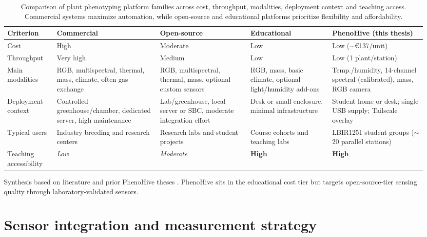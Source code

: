 \begin{table}[H]
\centering
\caption[Phenotyping Platform Families Comparison]{Comparison of plant phenotyping platform families across cost, throughput, modalities, deployment context and teaching access. Commercial systems maximize automation, while open-source and educational platforms prioritize flexibility and affordability.}
\label{tab:platform-landscape-comparison}

\footnotesize
\setlength{\tabcolsep}{4pt}
\renewcommand{\arraystretch}{1.25}
\begin{tabularx}{\textwidth}{P{2.6cm}Y Y Y Y}
\textbf{Criterion} & \textbf{Commercial} & \textbf{Open-source} & \textbf{Educational} & \textbf{PhenoHive (this thesis)} \\
\hline
Cost & High & Moderate & Low & Low ($\sim$€137/unit) \\
Throughput & Very high & Medium & Low & Low (1 plant/station) \\
Main modalities & RGB, multispectral, thermal, mass, climate, often gas exchange & RGB, multispectral, thermal, mass, optional custom sensors & RGB, mass, basic climate, optional light/humidity add-ons & Temp./humidity, 14-channel spectral (calibrated), mass, RGB camera \\
Deployment context & Controlled greenhouse/chamber, dedicated server, high maintenance & Lab/greenhouse, local server or SBC, moderate integration effort & Desk or small enclosure, minimal infrastructure & Student home or desk; single USB supply; Tailscale overlay \\
Typical users & Industry breeding and research centers & Research labs and student projects & Course cohorts and teaching labs & LBIR1251 student groups ($\sim$20 parallel stations) \\
Teaching accessibility & \textit{Low} & \textit{Moderate} & \textbf{High} & \textbf{High} \\
\end{tabularx}

\vspace{0.5em}
{\footnotesize Synthesis based on literature and prior PhenoHive theses \parencite{goffinet2024, colinet2025}. PhenoHive sits in the educational cost tier but targets open-source-tier sensing quality through laboratory-validated sensors.}
\end{table}

\section{Sensor integration and measurement strategy}


